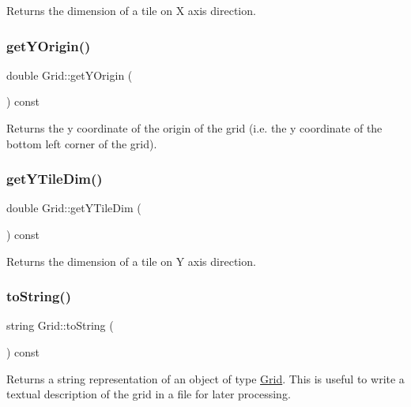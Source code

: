 \begin{DoxyReturn}{Returns}
the dimension of a tile on X axis direction. 
\end{DoxyReturn}
\mbox{\label{class_grid_a53141770920cf261579cf164a8909af9}} 
\subsubsection{\texorpdfstring{getYOrigin()}{getYOrigin()}}
{\footnotesize\ttfamily double Grid\+::get\+Y\+Origin (\begin{DoxyParamCaption}{ }\end{DoxyParamCaption}) const}

\begin{DoxyReturn}{Returns}
the y coordinate of the origin of the grid (i.\+e. the y coordinate of the bottom left corner of the grid). 
\end{DoxyReturn}
\mbox{\label{class_grid_aedfe477f5be79a375bd64a4d21765918}} 
\subsubsection{\texorpdfstring{getYTileDim()}{getYTileDim()}}
{\footnotesize\ttfamily double Grid\+::get\+Y\+Tile\+Dim (\begin{DoxyParamCaption}{ }\end{DoxyParamCaption}) const}

\begin{DoxyReturn}{Returns}
the dimension of a tile on Y axis direction. 
\end{DoxyReturn}
\mbox{\label{class_grid_ad48d195b5e333a94a3a14d6395252b2a}} 
\subsubsection{\texorpdfstring{toString()}{toString()}}
{\footnotesize\ttfamily string Grid\+::to\+String (\begin{DoxyParamCaption}{ }\end{DoxyParamCaption}) const}

\begin{DoxyReturn}{Returns}
a string representation of an object of type \mbox{\hyperlink{class_grid}{Grid}}. This is useful to write a textual description of the grid in a file for later processing. 
\end{DoxyReturn}
\mbox{\label{class_grid_a4bd2091f95030e86b78e7be903667e06}} 
